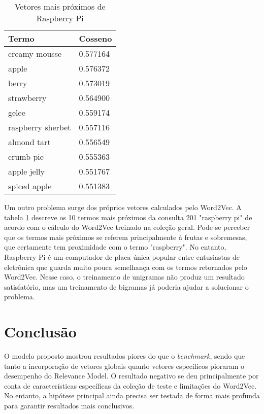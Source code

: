 \documentclass{article}
\begin{document}
\begin{center}
  \begin{table}
  \centering
  \begin{tabular}{ | l l | }
    \hline
    Termo & Cosseno \\
    \hline
        creamy mousse & 0.577164 \\ 
                apple & 0.576372 \\
                berry & 0.573019 \\
           strawberry & 0.564900 \\
                gelee & 0.559174 \\
    raspberry sherbet & 0.557116 \\
          almond tart & 0.556549 \\
            crumb pie & 0.555363 \\
          apple jelly & 0.551767 \\
         spiced apple & 0.551383 \\
    \hline
  \end{tabular}
  \caption{Vetores mais próximos de Raspberry Pi}
  \label{tab:raspberry_pi}
  \end{table}
\end{center}

Um outro problema surge dos próprios vetores calculados pelo Word2Vec. A tabela \ref{tab:raspberry_pi} descreve os
10 termos mais próximos da consulta 201 "raspberry pi" de acordo com o cálculo do Word2Vec treinado na coleção geral. 
Pode-se perceber que os termos mais próximos se referem principalmente à frutas e sobremesas, que certamente tem proximidade com
o termo "raspberry". No entanto, Raspberry Pi é um computador de placa única popular entre entusiastas 
de eletrônica que guarda muito pouca semelhança com os termos retornados pelo Word2Vec. Nesse caso,
o treinamento de unigramas não produz um resultado satisfatório, mas um treinamento de bigramas já poderia
ajudar a solucionar o problema.

\section{Conclusão}

O modelo proposto mostrou resultados piores do que o \textit{benchmark}, sendo que tanto a incorporação
de vetores globais quanto vetores específicos pioraram o desempenho do Relevance Model. O resultado
negativo se deu principalmente por conta de características específicas da coleção de teste e limitações do Word2Vec.
No entanto, a hipótese principal ainda precisa ser testada de forma mais profunda para garantir resultados mais
conclusivos.

 

\end{document}
